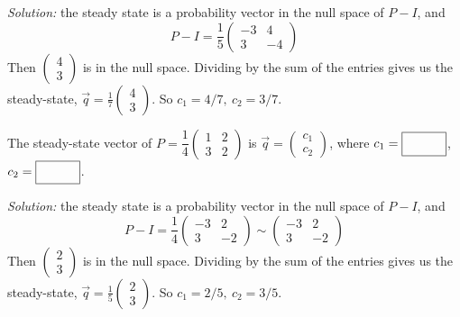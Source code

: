 \begin{parts}
        \ifnum {} {\color{DarkBlue} \textit{Solution:} the steady state is a probability vector in the null space of $P-I$, and $$P-I = \dfrac15\begin{pmatrix} -3&4\\3&-4 \end{pmatrix} $$ Then $\begin{pmatrix} 4\\3\end{pmatrix}$ is in the null space. Dividing by the sum of the entries gives us the steady-state, $\vec q = \frac17\begin{pmatrix} 4\\3\end{pmatrix}$. So $c_1 = 4/7, \ c_2 = 3/7$. } \fi
    \fi      


    \ifnum {}
        The steady-state vector of $P=\dfrac14\begin{pmatrix} 1&2\\3&2\end{pmatrix}$ is $\vec q = \begin{pmatrix} c_1 \\c_2 \end{pmatrix}$, where $c_1 = \framebox{\strut\hspace{1cm}}$, $c_2 = \framebox{\strut\hspace{1cm}}$.
        
        \ifnum {} {\color{DarkBlue} \textit{Solution:} the steady state is a probability vector in the null space of $P-I$, and $$P-I = \dfrac14\begin{pmatrix} -3&2\\3&-2 \end{pmatrix} \sim \begin{pmatrix} -3&2\\3&-2\end{pmatrix}$$ Then $\begin{pmatrix} 2\\3\end{pmatrix}$ is in the null space. Dividing by the sum of the entries gives us the steady-state, $\vec q = \frac15\begin{pmatrix} 2\\3\end{pmatrix}$. So $c_1 = 2/5, \ c_2 = 3/5$. } \fi
    \fi    

\end{parts}